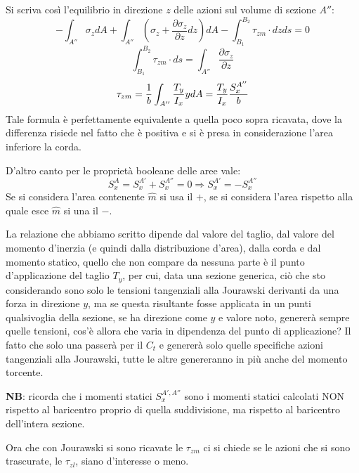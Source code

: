 \documentclass{article}
\begin{document}
\begin{adjustwidth}{2in}{}
		Si scriva così l'equilibrio in direzione $z$ delle azioni sul volume di sezione $A''$:
		\[ -\int_{A''}\sigma_zdA + \int_{A''}\left(\sigma_z + \dfrac{\partial\sigma_z}{\partial z}dz\right)dA - \int_{B_1}^{B_2} \tau_{zm} \cdot dz ds = 0 \]
		\[ \int_{B_1}^{B_2} \tau_{zm} \cdot ds = \int_{A''}\dfrac{\partial\sigma_z}{\partial z} \]
		\[ \tau_{zm} = {1\over b} \int_{A''}\dfrac{T_y}{I_x}ydA = \dfrac{T_y}{I_x}\dfrac{S_x^{A''}}{b}\]
		Tale formula è perfettamente equivalente a quella poco sopra ricavata, dove la differenza risiede nel fatto che è positiva e si è presa in considerazione l'area inferiore la corda. \newline 
		
		D'altro canto per le proprietà booleane delle aree vale: 
		\[ S_x^{A} = S_x^{A'} + S_x^{A''} = 0 \Rightarrow S_x^{A'} = -S_x^{A''}\]
		Se si considera l'area contenente $\hat{m}$ si usa il $+$, se si considera l'area rispetto alla quale esce $\hat{m}$ si una il $-$.\newline 
		
		La relazione che abbiamo scritto dipende dal valore del taglio, dal valore del momento d'inerzia (e quindi dalla distribuzione d'area), dalla corda e dal momento statico, quello che non compare da nessuna parte è il punto d'applicazione del taglio $T_y$, per cui, data una sezione generica, ciò che sto considerando sono solo le tensioni tangenziali alla Jourawski derivanti da una forza in direzione $y$, ma se questa risultante fosse applicata in un punti qualsivoglia della sezione, se ha direzione come $y$ e valore noto, genererà sempre quelle tensioni, cos'è allora che varia in dipendenza del punto di applicazione? Il fatto che solo una passerà per il $C_t$ e genererà solo quelle specifiche azioni tangenziali alla Jourawski, tutte le altre genereranno in più anche del momento torcente. \newline 
		
		\textbf{NB}: ricorda che i momenti statici $ S_x^{A',A''} $ sono i momenti statici calcolati NON rispetto al baricentro proprio di quella suddivisione, ma rispetto al baricentro dell'intera sezione. \newline
		
		Ora che con Jourawski si sono ricavate le $\tau_{zm}$ ci si chiede se le azioni che si sono trascurate, le $\tau_{zl}$, siano d'interesse o meno. 
		

\end{adjustwidth}
\end{document}
